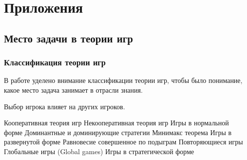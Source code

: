 \chapter{Приложения}
\section{Место задачи в теории игр}

\subsection*{Классификация теории игр}

В работе уделено внимание классификации теории игр, чтобы было понимание, какое место задача занимает в отрасли знания.

Выбор игрока влияет на других игроков.

Кооперативная теория игр
Некооперативная теория игр
Игры в нормальной форме
Доминантные и доминирующие стратегии
Минимакс теорема
Игры в развернутой форме
Равновесие совершенное по подыграм
Повторяющиеся игры
Глобальные игры (Global games)
Игры в стратегической форме
